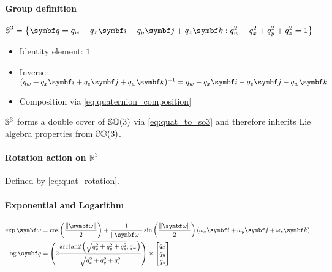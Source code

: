 \begin{properties}[breakable, title={$\Sthree$ formula sheet}]
  \paragraph{Group definition}
  \begin{equation}
    \Sthree = \left\{ \bq = q_w + q_x \bi + q_y \bj + q_z \bk : q_{w}^{2} + q_{x}^{2} + q_y^2 + q_{z}^{2} = 1 \right\}
  \end{equation}
  \begin{itemize}
    \item Identity element: $1$
    \item Inverse: $(q_w + q_x \bi + q_z \bj + q_w \bk)^{-1} = q_w - q_x \bi - q_z \bj - q_w \bk$
    \item Composition via \eqref{eq:quaternion_composition}
  \end{itemize}
  $\Sthree$ forms a double cover of ${\mathbb{SO}(3)}$ via \eqref{eq:quat_to_so3} and therefore inherits Lie algebra properties from ${\mathbb{SO}(3)}$.

  \paragraph{Rotation action on $\mathbb{R}^3$}
  Defined by \eqref{eq:quat_rotation}.

  \paragraph{Exponential and Logarithm}
  \begin{subequations}
    \begin{align}
      \label{eq:s3_exp}
      \exp \bomega & = \cos \left( \frac{\| \bomega \|}{2} \right) + \frac{1}{\| \bomega \|} \sin \left( \frac{\| \bomega \|}{2} \right) \left( \omega_x \bi + \omega_y \bj + \omega_z \bk \right), \\
      \label{eq:s3_log}
      \log \bq     & = \left( 2 \frac{ \arctantwo \left(\sqrt{q_x^2 + q_y^2 + q_z^2}, q_w \right) }{ \sqrt{q_x^2 + q_y^2 + q_z^2} } \right) \times \begin{bmatrix} q_{x} \\ q_{y} \\ q_{z} \end{bmatrix}.
    \end{align}
  \end{subequations}
\end{properties}

